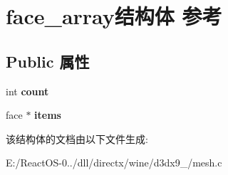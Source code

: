 \hypertarget{structface__array}{}\section{face\+\_\+array结构体 参考}
\label{structface__array}
\subsection*{Public 属性}
\begin{DoxyCompactItemize}
\item 
\mbox{\label{structface__array_a51b6981c6fe5a2a0dee17b519ca7b4a1}} 
int {\bfseries count}
\item 
\mbox{\label{structface__array_a35cac44d2e57ad1522e2e203a7a013ff}} 
face $\ast$ {\bfseries items}
\end{DoxyCompactItemize}


该结构体的文档由以下文件生成\+:\begin{DoxyCompactItemize}
\item 
E\+:/\+React\+O\+S-\/0../dll/directx/wine/d3dx9\+\_/mesh.\+c\end{DoxyCompactItemize}
